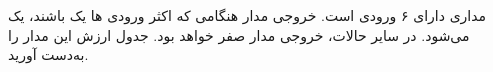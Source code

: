 مداری دارای ۶ ورودی است. خروجی مدار هنگامی که اکثر ورودی ها یک باشند، یک می‌شود. در سایر حالات، خروجی مدار صفر خواهد بود. جدول ارزش این مدار را به‌دست آورید.

